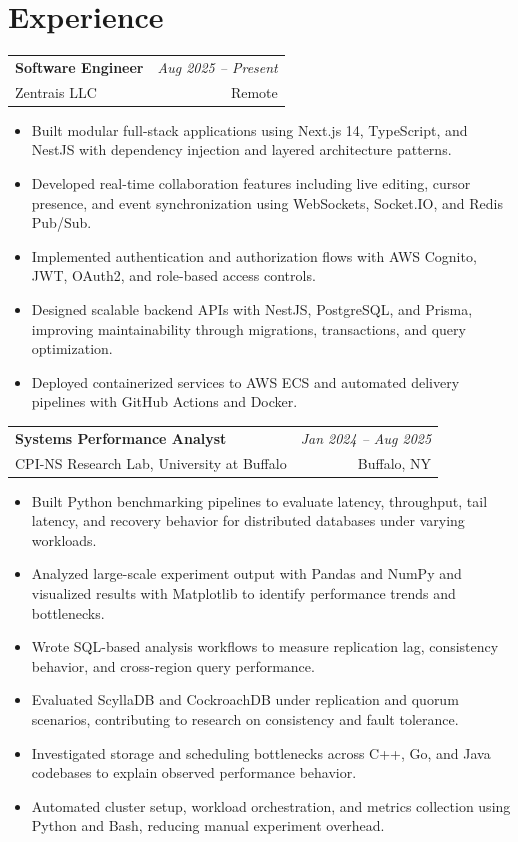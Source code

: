 \documentclass[letterpaper,10pt]{article}
\makeatletter
\newcommand{\resumeSubheading}[4]{
  \vspace{1pt}
  \begin{tabularx}{\textwidth}{@{}Xr@{}}
    \textbf{#1} & \textit{#2} \\
    \textcolor{textgray}{#3} & \textcolor{textgray}{#4} \\
  \end{tabularx}
}
\makeatother
\begin{document}
\section{Experience}
\resumeSubheading
  {Software Engineer}{Aug 2025 -- Present}
  {Zentrais LLC}{Remote}
\begin{itemize}
  \item Built modular full-stack applications using Next.js 14, TypeScript, and NestJS with dependency injection and layered architecture patterns.
  \item Developed real-time collaboration features including live editing, cursor presence, and event synchronization using WebSockets, Socket.IO, and Redis Pub/Sub.
  \item Implemented authentication and authorization flows with AWS Cognito, JWT, OAuth2, and role-based access controls.
  \item Designed scalable backend APIs with NestJS, PostgreSQL, and Prisma, improving maintainability through migrations, transactions, and query optimization.
  \item Deployed containerized services to AWS ECS and automated delivery pipelines with GitHub Actions and Docker.
\end{itemize}

\resumeSubheading
  {Systems Performance Analyst}{Jan 2024 -- Aug 2025}
  {CPI-NS Research Lab, University at Buffalo}{Buffalo, NY}
\begin{itemize}
  \item Built Python benchmarking pipelines to evaluate latency, throughput, tail latency, and recovery behavior for distributed databases under varying workloads.
  \item Analyzed large-scale experiment output with Pandas and NumPy and visualized results with Matplotlib to identify performance trends and bottlenecks.
  \item Wrote SQL-based analysis workflows to measure replication lag, consistency behavior, and cross-region query performance.
  \item Evaluated ScyllaDB and CockroachDB under replication and quorum scenarios, contributing to research on consistency and fault tolerance.
  \item Investigated storage and scheduling bottlenecks across C++, Go, and Java codebases to explain observed performance behavior.
  \item Automated cluster setup, workload orchestration, and metrics collection using Python and Bash, reducing manual experiment overhead.
\end{itemize}
\end{document}
